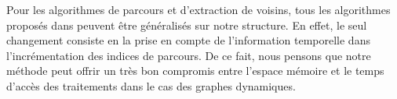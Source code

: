 	
			
			Pour les algorithmes de parcours et d'extraction de voisins, tous les algorithmes proposés dans \citep{hernandez2014compressed} peuvent être généralisés sur notre structure. En effet, le seul changement consiste en la  prise en compte de l'information temporelle dans l'incrémentation des indices de parcours. De ce fait, nous pensons que notre méthode peut offrir un très bon compromis entre l'espace mémoire et le temps d'accès des traitements dans le cas des graphes dynamiques. 
			

	